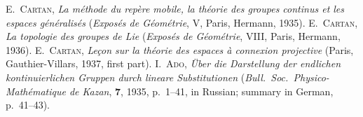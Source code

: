 \documentclass[leqno,11pt]{book}
\numberwithin{equation}{chapter}
\theoremstyle{shape1}
\theoremstyle{shapesmall}
\newcommand{\somespace}{\vspace{9pt}}
\begin{document}
\begin{thebibliography}{9}
  \textsc{E.~Cartan}, \emph{La méthode du repère mobile, la théorie des groupes continus et les espaces généralisés} (\emph{Exposés de Géométrie}, V, Paris, Hermann, 1935).
  \textsc{E.~Cartan}, \emph{La topologie des groupes de Lie} (\emph{Exposés de Géométrie}, VIII, Paris, Hermann, 1936).
  \textsc{E.~Cartan}, \emph{Leçon sur la théorie des espaces à connexion projective} (Paris, Gauthier-Villars, 1937, first part).
  \textsc{I.~Ado}, \emph{Über die Darstellung der endlichen kontinuierlichen Gruppen durch lineare Substitutionen} (\emph{Bull.~Soc.~Physico-Mathématique de Kazan}, \textbf{7}, 1935, p.~1--41, in Russian; summary in German, p.~41--43).
\end{thebibliography}



\thispagestyle{empty}
\somespace

{  
\printindex
{}
}
\end{document}
